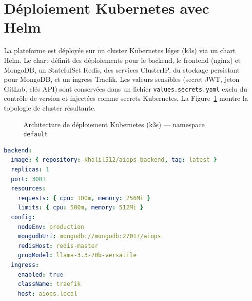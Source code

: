 \documentclass[12pt,a4paper,oneside]{report}
\begin{document}
\section{Déploiement Kubernetes avec Helm}
La plateforme est déployée sur un cluster Kubernetes léger (k3s) via un chart Helm. Le chart définit des déploiements pour le backend, le frontend (nginx) et MongoDB, un StatefulSet Redis, des services ClusterIP, du stockage persistant pour MongoDB, et un ingress Traefik. Les valeurs sensibles (secret JWT, jeton GitLab, clés API) sont conservées dans un fichier \texttt{values.secrets.yaml} exclu du contrôle de version et injectées comme secrets Kubernetes. La Figure~\ref{fig:k8s} montre la topologie de cluster résultante.

\begin{figure}[H]\centering
{}
\caption{Architecture de déploiement Kubernetes (k3s) --- namespace \texttt{default}}\label{fig:k8s}
\end{figure}

\begin{lstlisting}[style=custom,language=yaml,caption={Valeurs Helm (extrait)},label={lst:helmvaluesexcerpt}]
backend:
  image: { repository: khalil512/aiops-backend, tag: latest }
  replicas: 1
  port: 3001
  resources:
    requests: { cpu: 100m, memory: 256Mi }
    limits: { cpu: 500m, memory: 512Mi }
  config:
    nodeEnv: production
    mongodbUri: mongodb://mongodb:27017/aiops
    redisHost: redis-master
    groqModel: llama-3.3-70b-versatile
  ingress:
    enabled: true
    className: traefik
    host: aiops.local
\end{lstlisting}
\end{document}
